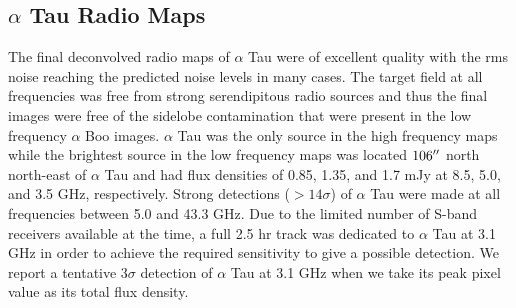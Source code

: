 \documentclass[iop]{emulateapj}
\begin{document}
\subsection{$\alpha$ Tau Radio Maps} \label{results2}
The final deconvolved radio maps of $\alpha$ Tau were of excellent quality with the rms noise reaching the predicted noise levels in many cases. The target field at all frequencies was free from strong serendipitous radio sources and thus the final images were free of the sidelobe contamination that were present in the low frequency $\alpha$ Boo images. $\alpha$ Tau was the only source in the high frequency maps while the brightest source in the low frequency maps was located $106\mbox{$^{\prime\prime}$}$ north north-east of $\alpha$ Tau and had flux densities of 0.85, 1.35, and 1.7 mJy at 8.5, 5.0, and 3.5 GHz, respectively. Strong detections ($>14\sigma$) of $\alpha$ Tau were made at all frequencies between 5.0 and 43.3 GHz. Due to the limited number of S-band receivers available at the time, a full 2.5 hr track was dedicated to $\alpha$ Tau at 3.1 GHz in order to achieve the required sensitivity to give a possible detection. We report a tentative $3\sigma$ detection of $\alpha$ Tau at 3.1 GHz when we take its peak pixel value as its total flux density. 
\end{document}
